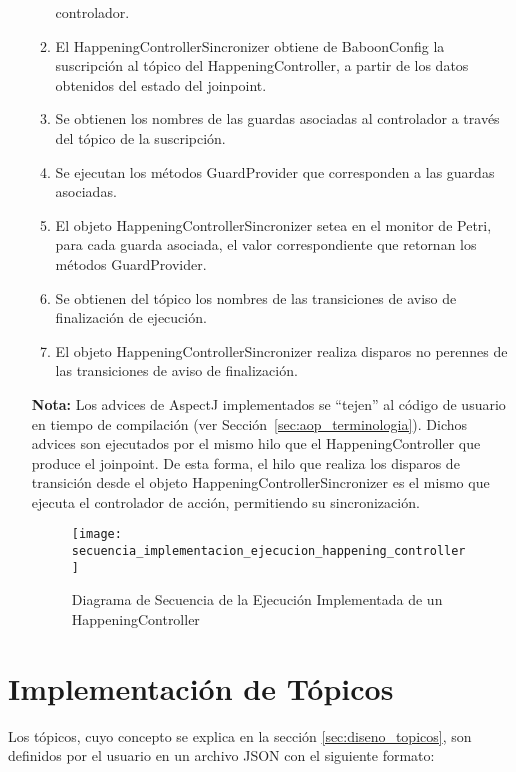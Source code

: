 \begin{itemize}
\begin{enumerate}
  	  controlador.
  	  \item El HappeningControllerSincronizer obtiene de BaboonConfig la
  	  suscripción al tópico del HappeningController, a partir de los datos
  	  obtenidos del estado del joinpoint.
  	  \item Se obtienen los nombres de las guardas asociadas al controlador a
  	  través del tópico de la suscripción.
  	  \item Se ejecutan los métodos GuardProvider que corresponden a las guardas
  	  asociadas.
  	  \item El objeto HappeningControllerSincronizer setea en el monitor de
  	  Petri, para cada guarda asociada, el valor correspondiente que retornan los métodos GuardProvider.
  	  \item Se obtienen del tópico los nombres de las transiciones de aviso de
  	  finalización de ejecución.
  	  \item El objeto HappeningControllerSincronizer realiza disparos no perennes
  	  de las transiciones de aviso de finalización.
  	\end{enumerate}
  	
  	\begin{framed}
	\textbf{Nota:} Los advices de AspectJ implementados se ``tejen'' al código de
	usuario en tiempo de compilación (ver Sección~\ref{sec:aop_terminologia}).
	Dichos advices son ejecutados por el mismo hilo que el HappeningController que
	produce el joinpoint. De esta forma, el hilo que realiza los disparos de
	transición desde el objeto HappeningControllerSincronizer es el mismo que
	ejecuta el controlador de acción, permitiendo su sincronización.
	\end{framed}



\begin{figure}[H]
	\hspace{-2,90cm}
	\texttt{[image: secuencia\_implementacion\_ejecucion\_happening\_controller]}
	\caption{Diagrama de Secuencia de la Ejecución Implementada de un
	HappeningController}
	\label{fig:diagrama_secuencia_implementacion_ejecucion_happening_controller}
\end{figure}

\end{itemize}

\section{Implementación de Tópicos}
Los tópicos, cuyo concepto se explica en la sección \ref{sec:diseno_topicos}, son definidos
por el usuario en un archivo JSON con el siguiente formato: \\

